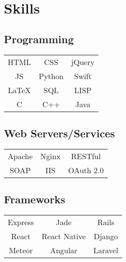 \documentclass[letterpaper]{deedy-resume} %
\begin{document}
\begin{minipage}[t]{0.33\textwidth}
  \sectionspace %


  \section{Skills}

  \vspace{2mm}

  \subsection{Programming}

  \begin{tabular}{ c c c }
    HTML    & CSS    & jQuery \\
    JS      & Python & Swift    \\
    \LaTeX & SQL    & LISP   \\
    C       & C++    & Java \\
  \end{tabular}

  \vspace{4mm}

  \subsection{Web Servers/Services}

  \begin{tabular}{ c c c }
    Apache & Nginx & RESTful \\
    SOAP & IIS & OAuth 2.0
  \end{tabular}

  \vspace{4mm}

  \subsection{Frameworks}

  \begin{tabular}{ c c c }
    Express & Jade & Rails \\
    React & React Native & Django \\
    Meteor & Angular & Laravel
  \end{tabular}

  \vspace{4mm}


\end{minipage}
\end{document}
